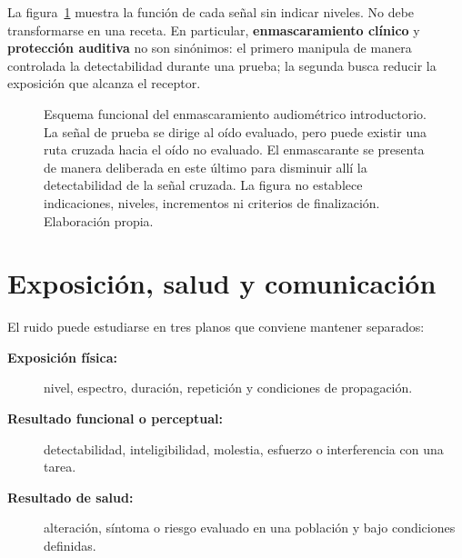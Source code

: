 
La figura~\ref{fig:u10-enmascaramiento-audiometrico} muestra la función de cada
señal sin indicar niveles. No debe transformarse en una receta. En particular,
\textbf{enmascaramiento clínico} y \textbf{protección auditiva} no son
sinónimos: el primero manipula de manera controlada la detectabilidad durante
una prueba; la segunda busca reducir la exposición que alcanza el receptor.

\begin{figure}[htbp]
    \centering
    
    \caption{Esquema funcional del enmascaramiento audiométrico introductorio.
    La señal de prueba se dirige al oído evaluado, pero puede existir una ruta
    cruzada hacia el oído no evaluado. El enmascarante se presenta de manera
    deliberada en este último para disminuir allí la detectabilidad de la
    señal cruzada. La figura no establece indicaciones, niveles, incrementos
    ni criterios de finalización. Elaboración propia.}
    \label{fig:u10-enmascaramiento-audiometrico}
\end{figure}


\section{Exposición, salud y comunicación}
\label{sec:u10-efectos}

El ruido puede estudiarse en tres planos que conviene mantener separados:
\begin{description}
    \item[\textbf{Exposición física:}] nivel, espectro, duración, repetición y
    condiciones de propagación.
    \item[\textbf{Resultado funcional o perceptual:}] detectabilidad,
    inteligibilidad, molestia, esfuerzo o interferencia con una tarea.
    \item[\textbf{Resultado de salud:}] alteración, síntoma o riesgo evaluado
    en una población y bajo condiciones definidas.
\end{description}

